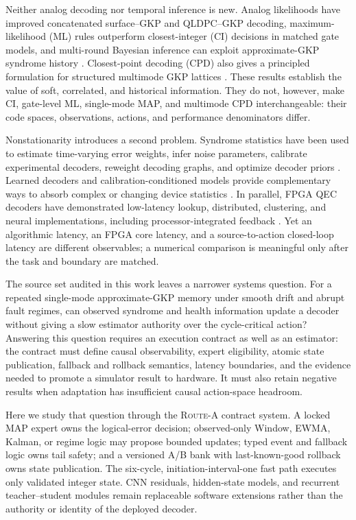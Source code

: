 \documentclass[11pt]{article}
\newcommand{\RouteA}{\textsc{Route-A}}
\begin{document}
Neither analog decoding nor temporal inference is new.  Analog likelihoods have
improved concatenated surface--GKP and QLDPC--GKP decoding, maximum-likelihood
(ML) rules outperform closest-integer (CI) decisions in matched gate models,
and multi-round Bayesian inference can exploit approximate-GKP syndrome history
\cite{fukui2018,noh2020,noh2022,wan2020,berent2024}.  Closest-point decoding
(CPD) also gives a principled formulation for structured multimode GKP lattices
\cite{lin2023}.  These results establish the value of soft, correlated, and
historical information.  They do not, however, make CI, gate-level ML,
single-mode MAP, and multimode CPD interchangeable: their code spaces,
observations, actions, and performance denominators differ.

Nonstationarity introduces a second problem.  Syndrome statistics have been
used to estimate time-varying error weights, infer noise parameters, calibrate
experimental decoders, reweight decoding graphs, and optimize decoder priors
\cite{spitz2018,wagner2021,chen2022,dgr2023,sivak2024}.  Learned decoders and
calibration-conditioned models provide complementary ways to absorb complex or
changing device statistics \cite{bausch2024,stein2026}.  In parallel, FPGA QEC
decoders have demonstrated low-latency lookup, distributed, clustering, and
neural implementations, including processor-integrated feedback
\cite{lilliput2022,helios2023,collision2025,caune2024,yang2026}.  Yet an
algorithmic latency, an FPGA core latency, and a source-to-action closed-loop
latency are different observables; a numerical comparison is meaningful only
after the task and boundary are matched.

The source set audited in this work leaves a narrower systems question.  For a
repeated single-mode approximate-GKP memory under smooth drift and abrupt fault
regimes, can observed syndrome and health information update a decoder without
giving a slow estimator authority over the cycle-critical action?  Answering
this question requires an execution contract as well as an estimator: the
contract must define causal observability, expert eligibility, atomic state
publication, fallback and rollback semantics, latency boundaries, and the
evidence needed to promote a simulator result to hardware.  It must also retain
negative results when adaptation has insufficient causal action-space headroom.

Here we study that question through the \RouteA{} contract system.  A locked MAP
expert owns the logical-error decision; observed-only Window, EWMA, Kalman, or
regime logic may propose bounded updates; typed event and fallback logic owns
tail safety; and a versioned A/B bank with last-known-good rollback owns state
publication.  The six-cycle, initiation-interval-one fast path executes only
validated integer state.  CNN residuals, hidden-state models, and recurrent
teacher--student modules remain replaceable software extensions rather than
the authority or identity of the deployed decoder.
\end{document}
